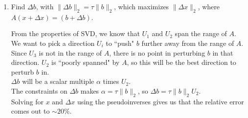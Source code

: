 \documentclass[12pt]{article}
\newenvironment{exercise}[2][Exercise]{\begin{trivlist}
\item[\hskip \labelsep{\bfseries #1}\hskip \labelsep{\bfseries #2.}]}{\end{trivlist}}
\begin{document}
\begin{exercise}{1}
\begin{enumerate}[label=(\alph*)]
    \item Find $\Delta b$, with $\|\Delta b\|_2 = \tau \|b\|_2$, which maximizes
      $\|\Delta x\|_2$, where $A(x + \Delta x) = (b + \Delta b)$.

      From the properties of SVD, we know that $U_1$ and $U_2$ span the range of $A$.
      We want to pick a direction $U_i$ to ``push" $b$ further away from the range
      of $A$. \\
      Since $U_3$ is not in the range of $A$, there is no point in
      perturbing $b$ in that direction. $U_2$ is ``poorly spanned" by $A$, so
      this will be the best direction to perturb $b$ in. \\
      $\Delta b$ will be a scalar multiple $\alpha$ times $U_2$. \\
      The constraints on $\Delta b$ makes $\alpha = \tau \|b\|_2$, so
      $\Delta b = \tau \|b\|_2 U_2$. \\

      Solving for $x$ and $\Delta x$ using the pseudoinverses gives us that
      the relative error comes out to $\sim20\%$.

  \end{enumerate}

\end{exercise}

\pagebreak
\end{document}
